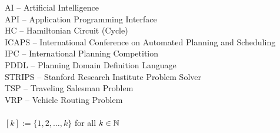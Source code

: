 AI -- Artificial Intelligence\\
API -- Application Programming Interface\\
HC -- Hamiltonian Circuit (Cycle)\\
ICAPS -- International Conference on Automated Planning and Scheduling\\
IPC -- International Planning Competition\\
PDDL -- Planning Domain Definition Language\\
STRIPS -- Stanford Research Institute Problem Solver\\
TSP -- Traveling Salesman Problem\\
VRP -- Vehicle Routing Problem\\
\\
$[k] := \{1, 2, \ldots, k\}$ for all $k \in \mathbb{N}$\\